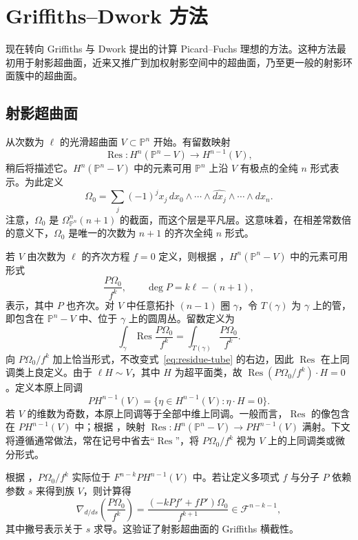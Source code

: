 \section{Griffiths--Dwork 方法}\label{sec:griffiths-dwork}

现在转向 Griffiths 与 Dwork 提出的计算 Picard--Fuchs 理想的方法。这种方法最初用于射影超曲面，近来又推广到加权射影空间中的超曲面，乃至更一般的射影环面簇中的超曲面。

\subsection{射影超曲面}\label{subsec:projective-residues}

从次数为 $\ell$ 的光滑超曲面 $V\subset\mathbb P^n$ 开始。有留数映射
\[
\operatorname{Res}:H^n(\mathbb P^n-V)\longrightarrow H^{n-1}(V),
\]
稍后将描述它。$H^n(\mathbb P^n-V)$ 中的元素可用 $\mathbb P^n$ 上沿 $V$ 有极点的全纯 $n$ 形式表示。为此定义
\[
\Omega_0=\sum_j(-1)^j x_j\,dx_0\wedge\cdots
\wedge\widehat{dx_j}\wedge\cdots\wedge dx_n.
\]
注意，$\Omega_0$ 是 $\Omega_{\mathbb P^n}^n(n+1)$ 的截面，而这个层是平凡层。这意味着，在相差常数倍的意义下，$\Omega_0$ 是唯一的次数为 $n+1$ 的齐次全纯 $n$ 形式。

若 $V$ 由次数为 $\ell$ 的齐次方程 $f=0$ 定义，则根据 ，$H^n(\mathbb P^n-V)$ 中的元素可用形式
\[
\frac{P\Omega_0}{f^k},\qquad\deg P=k\ell-(n+1),
\]
表示，其中 $P$ 也齐次。对 $V$ 中任意拓扑 $(n-1)$ 圈 $\gamma$，令 $T(\gamma)$ 为 $\gamma$ 上的管，即包含在 $\mathbb P^n-V$ 中、位于 $\gamma$ 上的圆周丛。留数定义为
\begin{equation}\label{eq:residue-tube}
\int_\gamma\operatorname{Res}\frac{P\Omega_0}{f^k}
=\int_{T(\gamma)}\frac{P\Omega_0}{f^k}.
\end{equation}
向 $P\Omega_0/f^k$ 加上恰当形式，不改变式~\eqref{eq:residue-tube} 的右边，因此 $\operatorname{Res}$ 在上同调类上良定义。由于 $\ell H\sim V$，其中 $H$ 为超平面类，故 $\operatorname{Res}(P\Omega_0/f^k)\cdot H=0$。定义本原上同调
\[
PH^{n-1}(V)=\{\eta\in H^{n-1}(V):\eta\cdot H=0\}.
\]
若 $V$ 的维数为奇数，本原上同调等于全部中维上同调。一般而言，$\operatorname{Res}$ 的像包含在 $PH^{n-1}(V)$ 中；根据 ，映射 $\operatorname{Res}:H^n(\mathbb P^n-V)\to PH^{n-1}(V)$ 满射。下文将遵循通常做法，常在记号中省去“$\operatorname{Res}$”，将 $P\Omega_0/f^k$ 视为 $V$ 上的上同调类或微分形式。

根据 ，$P\Omega_0/f^k$ 实际位于 $F^{n-k}PH^{n-1}(V)$ 中。若让定义多项式 $f$ 与分子 $P$ 依赖参数 $s$ 来得到族 $V$，则计算得
\[
\nabla_{d/ds}\left(\frac{P\Omega_0}{f^k}\right)
=\frac{(-kPf'+fP')\Omega_0}{f^{k+1}}
\in\mathcal F^{n-k-1},
\]
其中撇号表示关于 $s$ 求导。这验证了射影超曲面的 Griffiths 横截性。

